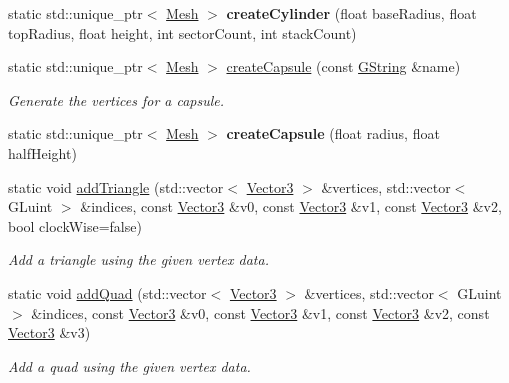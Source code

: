 \begin{Indent}
\begin{DoxyCompactItemize}
\mbox{\label{classrev_1_1_polygon_cache_ad3affb5933a7493a7d4d75b5a4fe2503}} 
static std\+::unique\+\_\+ptr$<$ \mbox{\hyperlink{classrev_1_1_mesh}{Mesh}} $>$ {\bfseries create\+Cylinder} (float base\+Radius, float top\+Radius, float height, int sector\+Count, int stack\+Count)
\item 
\mbox{\label{classrev_1_1_polygon_cache_a9b47c22a27fef85ac926c71208d18192}} 
static std\+::unique\+\_\+ptr$<$ \mbox{\hyperlink{classrev_1_1_mesh}{Mesh}} $>$ \mbox{\hyperlink{classrev_1_1_polygon_cache_a9b47c22a27fef85ac926c71208d18192}{create\+Capsule}} (const \mbox{\hyperlink{classrev_1_1_g_string}{G\+String}} \&name)
\begin{DoxyCompactList}\small\item\em Generate the vertices for a capsule. \end{DoxyCompactList}\item 
\mbox{\label{classrev_1_1_polygon_cache_a8ab80545142b5859b9042e5b79547a9a}} 
static std\+::unique\+\_\+ptr$<$ \mbox{\hyperlink{classrev_1_1_mesh}{Mesh}} $>$ {\bfseries create\+Capsule} (float radius, float half\+Height)
\item 
\mbox{\label{classrev_1_1_polygon_cache_adc7f6e93951085a456929bee5b4db91d}} 
static void \mbox{\hyperlink{classrev_1_1_polygon_cache_adc7f6e93951085a456929bee5b4db91d}{add\+Triangle}} (std\+::vector$<$ \mbox{\hyperlink{classrev_1_1_vector}{Vector3}} $>$ \&vertices, std\+::vector$<$ G\+Luint $>$ \&indices, const \mbox{\hyperlink{classrev_1_1_vector}{Vector3}} \&v0, const \mbox{\hyperlink{classrev_1_1_vector}{Vector3}} \&v1, const \mbox{\hyperlink{classrev_1_1_vector}{Vector3}} \&v2, bool clock\+Wise=false)
\begin{DoxyCompactList}\small\item\em Add a triangle using the given vertex data. \end{DoxyCompactList}\item 
\mbox{\label{classrev_1_1_polygon_cache_add04a045e14b278602bacd266950ce92}} 
static void \mbox{\hyperlink{classrev_1_1_polygon_cache_add04a045e14b278602bacd266950ce92}{add\+Quad}} (std\+::vector$<$ \mbox{\hyperlink{classrev_1_1_vector}{Vector3}} $>$ \&vertices, std\+::vector$<$ G\+Luint $>$ \&indices, const \mbox{\hyperlink{classrev_1_1_vector}{Vector3}} \&v0, const \mbox{\hyperlink{classrev_1_1_vector}{Vector3}} \&v1, const \mbox{\hyperlink{classrev_1_1_vector}{Vector3}} \&v2, const \mbox{\hyperlink{classrev_1_1_vector}{Vector3}} \&v3)
\begin{DoxyCompactList}\small\item\em Add a quad using the given vertex data. \end{DoxyCompactList}\end{DoxyCompactItemize}
\end{Indent}
